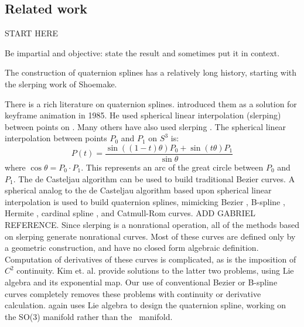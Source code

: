 \documentclass[12pt]{article}
\begin{document}




\subsection{Related work}
\label{sec:prevwork}

START HERE

Be impartial and objective: state the result and sometimes put it in context.

The construction of quaternion splines has a relatively long history,
starting with the slerping work of Shoemake.


There is a rich literature on quaternion splines.
\cite{shoemake85} introduced them as a solution 
for keyframe animation in 1985.
He used spherical linear interpolation (slerping) between points on .
Many others have also used slerping 
\cite{duff85,pletinckx89,schlag91,nielson92,nielson93,kim95,nam95}.
The spherical linear interpolation between points $P_0$ and $P_1$ on $S^3$ is:
\[ P(t) = \frac{\sin((1-t)\theta) P_0 + \sin(t \theta) P_1}{\sin \theta}
\]
where $\cos \theta = P_0 \cdot P_1$.
This represents an arc of the great circle between $P_0$ and $P_1$.
The de Casteljau algorithm can be used to build traditional Bezier curves.
A spherical analog to the de Casteljau algorithm based upon
spherical linear interpolation is used to build quaternion splines,
mimicking Bezier \cite{shoemake85,kim95}, B-spline 
\cite{duff85,nielson92,nielson93,kim95}, Hermite \cite{kim95,nam95},
cardinal spline \cite{pletinckx89}, and Catmull-Rom \cite{schlag91} curves.
ADD GABRIEL REFERENCE.
Since slerping is a nonrational operation,
all of the methods based on slerping generate nonrational curves.
Most of these curves are defined only by a geometric construction, and have
no closed form algebraic definition.
Computation of derivatives of these curves is complicated,
as is the imposition of $C^2$ continuity.
Kim et. al. \cite{kim95} provide solutions to the latter two problems,
using Lie algebra and its exponential map.
Our use of conventional Bezier or B-spline curves completely removes 
these problems with continuity or derivative calculation.
\cite{park97} again uses Lie algebra to design the quaternion spline,
working on the SO(3) manifold rather than the \ manifold.
\end{document}
